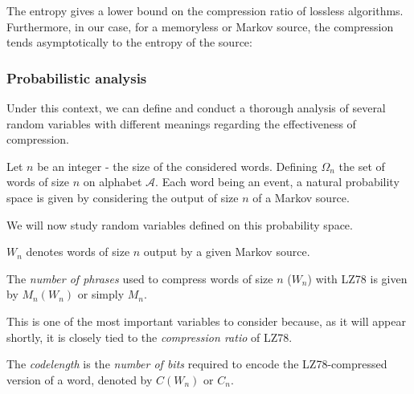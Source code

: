     
    The entropy gives a lower bound on the compression 
    ratio of lossless algorithms. Furthermore, in our
    case, for a memoryless or Markov source, the compression
    tends asymptotically to the entropy of the source:
    

    \begin{prop}
        \label{prop:lowerbound}
    \end{prop}


\subsubsection{ Probabilistic analysis }

Under this context, we can define and conduct a thorough
analysis of several random variables with different meanings
regarding the effectiveness of compression.

\begin{nota}
    \label{nota:universe}
    Let $n$ be an integer - the size of the considered words.
    Defining $\Omega_n$ the set of words of size $n$ on alphabet
    $\mathcal{A}$. Each word being an event, a natural probability
    space is given by considering the output of size $n$ of a Markov
    source.
\end{nota}

\begin{rmk}
    \label{rmk:probaspace}
    We will now study random variables defined 
    on this probability space. 
\end{rmk}

\begin{nota}
    \label{nota:output}
    $W_n$ denotes words of size $n$ output by a given Markov source.
\end{nota}

\begin{nota}
    \label{nota:numberphrases}
    The \emph{number of phrases} used to compress words of size $n$ ($W_n$) with
    LZ78 is given by $M_n(W_n)$ or simply $M_n$.
\end{nota}

\begin{rmk}
    \label{rmk:numberphrases}
    This is one of the most important variables to consider because,
    as it will appear shortly, it is closely tied to the \emph{compression 
    ratio} of LZ78.
\end{rmk}

\begin{df}
    \label{df:codelength}
    The \emph{codelength} is the \emph{number of bits} required 
    to encode the LZ78-compressed version of a word, denoted by $C(W_n)$ or $C_n$.
\end{df}

